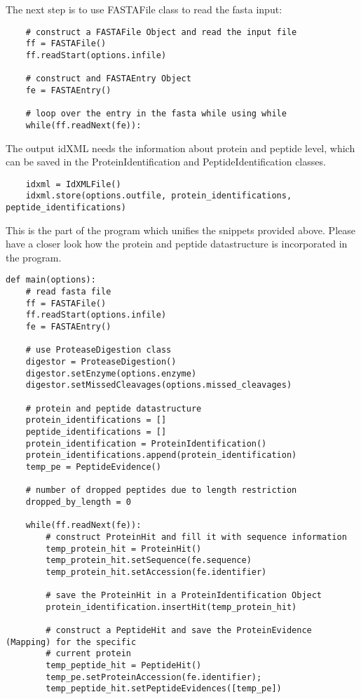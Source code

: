 {\noindent The next step is to use FASTAFile class to read the fasta input:
\begin{lstlisting}
    # construct a FASTAFile Object and read the input file
    ff = FASTAFile()
    ff.readStart(options.infile)
    
    # construct and FASTAEntry Object 
    fe = FASTAEntry()
    
    # loop over the entry in the fasta while using while
    while(ff.readNext(fe)): 
\end{lstlisting}

\noindent The output idXML needs the information about protein and peptide level, which can be saved in the ProteinIdentification and PeptideIdentification classes. 
\begin{lstlisting}
    idxml = IdXMLFile()
    idxml.store(options.outfile, protein_identifications, peptide_identifications)
\end{lstlisting}

\noindent This is the part of the program which unifies the snippets provided above. Please have a closer look how the protein and peptide datastructure is incorporated in the program. 

\begin{lstlisting}
def main(options):
    # read fasta file  
    ff = FASTAFile()
    ff.readStart(options.infile)
    fe = FASTAEntry()

    # use ProteaseDigestion class 
    digestor = ProteaseDigestion()
    digestor.setEnzyme(options.enzyme)
    digestor.setMissedCleavages(options.missed_cleavages)

    # protein and peptide datastructure
    protein_identifications = []
    peptide_identifications = []
    protein_identification = ProteinIdentification()
    protein_identifications.append(protein_identification)
    temp_pe = PeptideEvidence()

    # number of dropped peptides due to length restriction
    dropped_by_length = 0

    while(ff.readNext(fe)):  
        # construct ProteinHit and fill it with sequence information
        temp_protein_hit = ProteinHit()
        temp_protein_hit.setSequence(fe.sequence)
        temp_protein_hit.setAccession(fe.identifier)

        # save the ProteinHit in a ProteinIdentification Object 
        protein_identification.insertHit(temp_protein_hit)
       
        # construct a PeptideHit and save the ProteinEvidence (Mapping) for the specific 
        # current protein
        temp_peptide_hit = PeptideHit()
        temp_pe.setProteinAccession(fe.identifier);
        temp_peptide_hit.setPeptideEvidences([temp_pe])


\end{lstlisting}}

